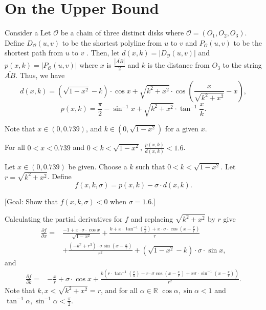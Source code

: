 \chapter{On the Upper Bound}
Consider a Let $\mathcal{O}$ be a chain of three distinct disks where $\mathcal{O} = (O_1, O_2, O_3)$. Define $D_\mathcal{O}(u,v)$ to be the shortest polyline from $u$ to $v$ 
and $P_\mathcal{O}(u,v)$ to be the shortest path from $u$ to $v$
.
Then, let $d(x, k) = \left|D_\mathcal{O}(u,v)\right|$ and $p(x, k) =| P_\mathcal{O}(u,v) |$ where $x$ is $\frac{|\overline{AB}|}{2}$ and $k$ is the distance from $O_3$ to the string $\overline{AB}$.
Thus, we have
\[d(x, k) = \left(\sqrt{1- x^2} - k\right)\cdot\cos{x} + \sqrt{k^2 + x^2}\cdot\cos{\left(\frac{x}{\sqrt{k^2 + x^2}} - x\right)},\]
\[p(x, k) = \frac{\pi}{2} - \sin^{-1}{x} + \sqrt{k^2+x^2}\cdot\tan^{-1}{\frac{x}{k}}.\]

Note that $x\in (0, 0.739)$, and $k\in (0, \sqrt{1-x^2})$ for a given $x$. 

\begin{theorem}
For all $0<x<0.739$ and $0<k<\sqrt{1-x^2}$, $\frac{p(x, k)}{d(x, k)} < 1.6$.
\end{theorem}
Let $x\in (0, 0.739)$ be given. Choose a $k$ such that $0< k < \sqrt{1-x^2}$. Let $r = \sqrt{k^2 + x^2}$.
Define 
\[f(x, k, \sigma) = p(x, k) - \sigma\cdot d(x, k).\] 

[Goal: Show that $f(x, k, \sigma) < 0$ when $\sigma = 1.6$.]

Calculating the partial derivatives for $f$ and replacing $\sqrt{k^2 + x^2}$ by $r$ give
\begin{align*}
    \frac{\partial f}{\partial x}  = &\frac{-1+x\cdot\sigma\cdot\cos{x}}{\sqrt{1-x^2}} 
+ \frac{k+ x\cdot\tan^{-1}{(\frac{x}{k})}+ x\cdot\sigma\cdot\cos{(x-\frac{x}{r})}}{r}\\
&+ \frac{(-k^2+ r^3)\cdot\sigma\sin{(x-\frac{x}{r})}}{r^2}
+ (\sqrt{1-x^2}-k)\cdot \sigma\cdot\sin{x} ,
\end{align*}
and
\begin{align*}
    \frac{\partial f}{\partial k}  = & -\frac{x}{r} 
    + \sigma\cdot\cos x
    + \frac{k(r\cdot \tan^{-1}(\frac{x}{k})- r\cdot\sigma\cos(x-\frac{x}{r}) + x\sigma\cdot \sin^{-1}(x-\frac{x}{r}))}{r^2}.
\end{align*}
Note that $k, x < \sqrt{k^2 + x^2} = r$, and for all $\alpha\in \mathbb{R}$ $\cos\alpha, \sin\alpha < 1$ and $\tan^{-1}\alpha, \sin^{-1}\alpha <\frac{\pi}{2}$. 

